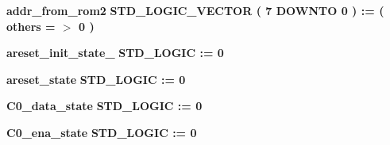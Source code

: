 \begin{DoxyCompactItemize}
\item 
{\bf addr\+\_\+from\+\_\+rom2} {\bfseries \textcolor{comment}{S\+T\+D\+\_\+\+L\+O\+G\+I\+C\+\_\+\+V\+E\+C\+T\+OR}\textcolor{vhdlchar}{ }\textcolor{vhdlchar}{(}\textcolor{vhdlchar}{ }\textcolor{vhdlchar}{ } \textcolor{vhdldigit}{7} \textcolor{vhdlchar}{ }\textcolor{keywordflow}{D\+O\+W\+N\+TO}\textcolor{vhdlchar}{ }\textcolor{vhdlchar}{ } \textcolor{vhdldigit}{0} \textcolor{vhdlchar}{ }\textcolor{vhdlchar}{)}\textcolor{vhdlchar}{ }\textcolor{vhdlchar}{ }\textcolor{vhdlchar}{ }\textcolor{vhdlchar}{\+:}\textcolor{vhdlchar}{=}\textcolor{vhdlchar}{ }\textcolor{vhdlchar}{(}\textcolor{vhdlchar}{ }\textcolor{vhdlchar}{ }\textcolor{keywordflow}{others}\textcolor{vhdlchar}{ }\textcolor{vhdlchar}{ }\textcolor{vhdlchar}{=}\textcolor{vhdlchar}{ }\textcolor{vhdlchar}{$>$}\textcolor{vhdlchar}{ }\textcolor{vhdlchar}{\textquotesingle{}}\textcolor{vhdlchar}{ } \textcolor{vhdldigit}{0} \textcolor{vhdlchar}{ }\textcolor{vhdlchar}{\textquotesingle{}}\textcolor{vhdlchar}{ }\textcolor{vhdlchar}{)}\textcolor{vhdlchar}{ }} 
\item 
{\bf areset\+\_\+init\+\_\+state\+\_} {\bfseries \textcolor{comment}{S\+T\+D\+\_\+\+L\+O\+G\+IC}\textcolor{vhdlchar}{ }\textcolor{vhdlchar}{ }\textcolor{vhdlchar}{\+:}\textcolor{vhdlchar}{=}\textcolor{vhdlchar}{ }\textcolor{vhdlchar}{ }\textcolor{vhdlchar}{\textquotesingle{}}\textcolor{vhdlchar}{ } \textcolor{vhdldigit}{0} \textcolor{vhdlchar}{ }\textcolor{vhdlchar}{\textquotesingle{}}\textcolor{vhdlchar}{ }} 
\item 
{\bf areset\+\_\+state} {\bfseries \textcolor{comment}{S\+T\+D\+\_\+\+L\+O\+G\+IC}\textcolor{vhdlchar}{ }\textcolor{vhdlchar}{ }\textcolor{vhdlchar}{\+:}\textcolor{vhdlchar}{=}\textcolor{vhdlchar}{ }\textcolor{vhdlchar}{ }\textcolor{vhdlchar}{\textquotesingle{}}\textcolor{vhdlchar}{ } \textcolor{vhdldigit}{0} \textcolor{vhdlchar}{ }\textcolor{vhdlchar}{\textquotesingle{}}\textcolor{vhdlchar}{ }} 
\item 
{\bf C0\+\_\+data\+\_\+state} {\bfseries \textcolor{comment}{S\+T\+D\+\_\+\+L\+O\+G\+IC}\textcolor{vhdlchar}{ }\textcolor{vhdlchar}{ }\textcolor{vhdlchar}{\+:}\textcolor{vhdlchar}{=}\textcolor{vhdlchar}{ }\textcolor{vhdlchar}{ }\textcolor{vhdlchar}{\textquotesingle{}}\textcolor{vhdlchar}{ } \textcolor{vhdldigit}{0} \textcolor{vhdlchar}{ }\textcolor{vhdlchar}{\textquotesingle{}}\textcolor{vhdlchar}{ }} 
\item 
{\bf C0\+\_\+ena\+\_\+state} {\bfseries \textcolor{comment}{S\+T\+D\+\_\+\+L\+O\+G\+IC}\textcolor{vhdlchar}{ }\textcolor{vhdlchar}{ }\textcolor{vhdlchar}{\+:}\textcolor{vhdlchar}{=}\textcolor{vhdlchar}{ }\textcolor{vhdlchar}{ }\textcolor{vhdlchar}{\textquotesingle{}}\textcolor{vhdlchar}{ } \textcolor{vhdldigit}{0} \textcolor{vhdlchar}{ }\textcolor{vhdlchar}{\textquotesingle{}}\textcolor{vhdlchar}{ }} 

\end{DoxyCompactItemize}
